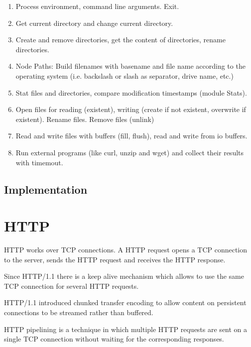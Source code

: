 \begin{enumerate}

\item Process environment, command line arguments. Exit.

\item Get current directory and change current directory.

\item Create and remove directories, get the content of directories, rename
  directories.

\item Node Paths: Build filenames with basename and file name according to the
  operating system (i.e. backslash or slash as separator, drive name, etc.)

\item Stat files and directories, compare modification timestamps (module
  Stats).

\item Open files for reading (existent), writing (create if not existent,
  overwrite if existent). Rename files. Remove files (unlink)

\item Read and write files with buffers (fill, flush), read and write from io
  buffers.

\item Run external programs (like curl, unzip and wget) and collect their
  results with timemout.
\end{enumerate}


\subsection{Implementation}


\section{HTTP}

HTTP works over TCP connections. A HTTP request opens a TCP connection to the
server, sends the HTTP request and receives the HTTP response.

Since HTTP/1.1 there is a keep alive mechanism which allows to use the same
TCP connection for several HTTP requests.

HTTP/1.1 introduced chunked transfer encoding to allow content on persistent
connections to be streamed rather than buffered.

HTTP pipelining is a technique in which multiple HTTP requests are sent on a
single TCP connection without waiting for the corresponding responses.

